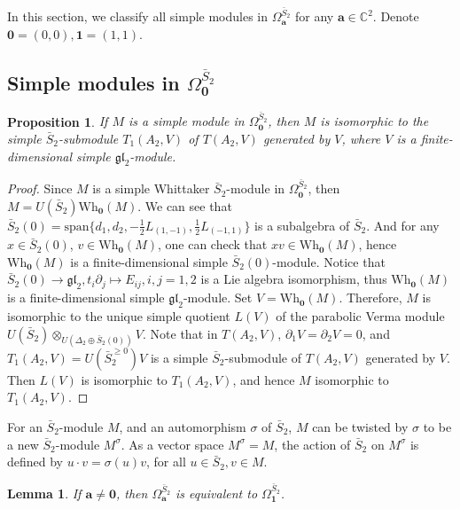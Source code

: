 \documentclass[12pt,a4paper]{amsart}
\newtheorem{Proposition}[Theorem]{Proposition}
\newtheorem{Lemma}[Theorem]{Lemma}
\def\C{\mathbb{C}}
\def\ba{\mathbf{a}}
\def\m1{\mathbf{1}}
\def\gl{\mathfrak{gl}}
\def\p{\partial}
\def\bS{\bar{S}_2}
\begin{document}
In this section, we classify all simple modules in $\Omega^{\bar{S}_2}_\ba$
for any $\ba\in \C^2$. Denote $\mathbf{0}=(0,0), \m1=(1,1)$.

\subsection{Simple modules in $\Omega^{\bar{S}_2}_{\mathbf{0}}$}



\begin{Proposition} If $M$ is a simple module in $\Omega^{\bar{S}_2}_\mathbf{0}$, then $M$ is isomorphic to the simple $\bar{S}_2$-submodule $T_1(A_2, V)$  of $T(A_2,V)$ generated by $V$, where $V$ is a finite-dimensional simple $\gl_2$-module.
\end{Proposition}

\begin{proof}
Since $M$ is a simple Whittaker $\bar{S}_2$-module in $\Omega^{\bar{S}_2}_\mathbf{0}$, then $M=U(\bar{S}_2)\text{Wh}_{\mathbf{0}}(M)$. We can see that $\bar{S}_2(0)=\text{span}\{d_1, d_2, -\frac{1}{2}L_{(1,-1)}, \frac{1}{2}L_{(-1,1)}\}$ is a subalgebra of $\bar{S}_2$. And for any $x\in \bar{S}_2(0)$, $v\in \text{Wh}_{\mathbf{0}}(M)$, one can check that $xv\in \text{Wh}_{\mathbf{0}}(M)$, hence $\text{Wh}_{\mathbf{0}}(M)$ is a finite-dimensional simple $\bar{S}_2(0)$-module. Notice that
$\bar{S}_2(0) \rightarrow \gl_2, t_i\p_j \mapsto E_{ij}, i,j=1,2$ is a Lie algebra isomorphism, thus $\text{Wh}_{\mathbf{0}}(M)$ is a finite-dimensional simple $\gl_2$-module.  Set $V=\text{Wh}_{\mathbf{0}}(M)$.
Therefore, $M$ is isomorphic to the unique simple quotient $L(V)$ of the parabolic Verma module $U(\bar{S}_2)\otimes_{U(\Delta_2\oplus \bar{S}_2(0))}V$. Note that in $T(A_2, V)$, $\p_1V=\p_2V=0$, and  $T_1(A_2,V)
=U(\bar{S}_2^{\geq 0})V$ is a simple $\bar{S}_2$-submodule of
$T(A_2, V)$ generated by $V$. Then $L(V)$ is isomorphic to
$T_1(A_2, V)$, and hence $M$ isomorphic to
$T_1(A_2, V)$.
\end{proof}



For an $\bS$-module $M$, and  an automorphism $\sigma$ of $\bS$, $M$ can be twisted by $\sigma$ to  be a new $\bS$-module $M^\sigma$.
As a vector space $M^\sigma=M$, the action of $\bS$ on $M^\sigma$ is defined by $u\cdot v= \sigma(u)v$, for all $u\in \bS, v\in M$.

\begin{Lemma}\label{omega-cat}
If $\ba\neq \mathbf{0}$, then $\Omega^{\bar{S}_2}_\ba$ is equivalent to $\Omega^{\bar{S}_2}_{\m1}$.
\end{Lemma}
\end{document}

